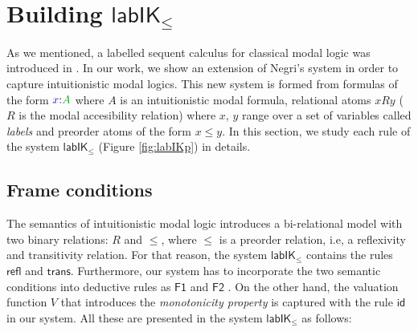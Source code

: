 \documentclass[a4paper]{article}
\theoremstyle{plain}
\theoremstyle{definition}
\newcommand*{\lab}{\mathsf{lab}}
\newcommand*{\IK}{\mathsf{IK}}
\newcommand*{\labIKp}{\lab\IK_{\le}}
\newcommand*{\fm}[1]{{\color{notgreen}{#1}}}
\newcommand*{\lb}[1]{{\color{blue}{#1}}}
\newcommand*{\labels}[2]{\lb{#1}\mathord{:}\fm{#2}}
\newcommand*{\rn}[1]  {\ensuremath{\mathsf{#1}}}
\begin{document}
\section{Building $\labIKp$}

As we mentioned, a labelled sequent calculus for classical modal logic was introduced in \cite{negri:jpl2005}. In our work, we show an extension of Negri's system in order to capture intuitionistic modal logics. This new system is formed from formulas of the form $\labels{x}{A}$ where $A$ is an intuitionistic modal formula, relational atoms $xRy$ ($R$ is the modal accesibility relation) where $x$, $y$ range over a set of variables called \emph{labels} and preorder atoms of the form $x \le y$. In this section, we study each rule of the system $\labIKp$ (Figure \ref{fig:labIKp}) in details. 

\subsection{Frame conditions}
The semantics of intuitionistic modal logic introduces a bi-relational model with two binary relations: $R$ and $\le$, where $\le$ is a preorder relation, i.e, a reflexivity and transitivity relation. For that reason, the system $\labIKp$ contains the rules $\rn{refl}$ and $\rn{trans}$. Furthermore, our system has to incorporate the two semantic conditions into deductive rules as $\rn{F1}$ and $\rn{F2}$ . On the other hand, the valuation function $V$ that introduces the \emph{monotonicity property} is captured with the rule $\rn{id}$ in our system. All these are presented in the system $\labIKp$ as follows:
\end{document}
